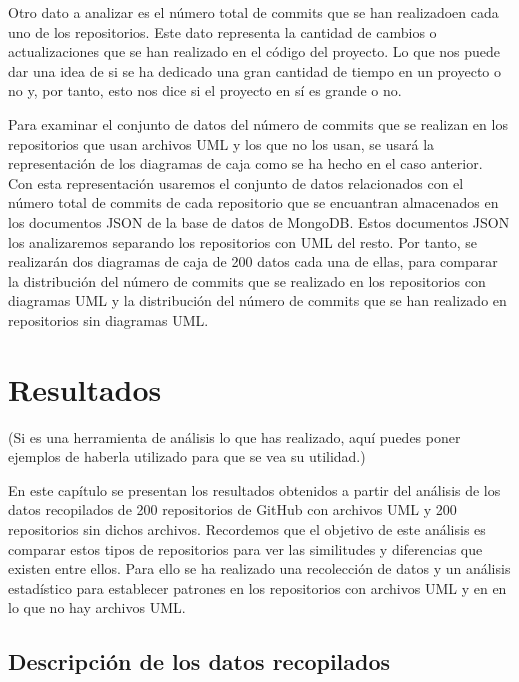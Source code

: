 \documentclass[a4paper, 12pt]{book}
\begin{document}
Otro dato a analizar es el número total de commits que se han realizadoen cada uno de los repositorios.
Este dato representa la cantidad de cambios o actualizaciones que se han realizado en el código del proyecto.
Lo que nos puede dar una idea de si se ha dedicado una gran cantidad de tiempo en un proyecto o no y, por tanto, esto nos dice si el proyecto en sí es grande o no. 


Para examinar el conjunto de datos del número de commits que se realizan en los repositorios que usan archivos UML y los que no los usan, se usará la representación de  los diagramas de caja como se ha hecho en el caso anterior.
Con esta representación usaremos el conjunto de datos relacionados con el número total de commits de cada repositorio que se encuantran almacenados en los documentos JSON de la base de datos de MongoDB.
Estos documentos JSON los analizaremos separando los repositorios con UML del resto. 
Por tanto, se realizarán dos diagramas de caja de 200 datos cada una de ellas, para comparar la distribución del número de commits que se realizado en los repositorios con diagramas UML y la distribución del número de commits que se han realizado en repositorios sin diagramas UML.




\cleardoublepage
\chapter{Resultados}
\label{chap:resultados}

 
(Si es una herramienta de análisis lo que has realizado, aquí puedes poner ejemplos de haberla utilizado para que se vea su utilidad.)

En este capítulo se presentan los resultados obtenidos a partir del análisis de los datos recopilados de 200 repositorios de GitHub con archivos UML y 200 repositorios sin dichos archivos.
Recordemos que el objetivo de este análisis es comparar estos tipos de repositorios para ver las similitudes y diferencias que existen entre ellos.
Para ello se ha realizado una recolección de datos y un análisis estadístico para establecer patrones en los repositorios con archivos UML y en en lo que no hay archivos UML.


\section{Descripción de los datos recopilados}
\label{sec:descripción de los datos recopilado}
\end{document}
